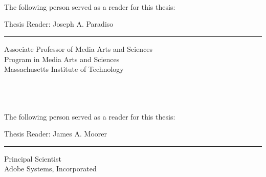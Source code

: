 
 \cleardoublepage
{}
\begin{fullwidth}
\mbox{ }\\
\mbox{ }\\
\mbox{ }\\ 
\vfill
\noindent The following person served as a reader for this thesis:\\
\vspace{10mm}

\noindent Thesis Reader: \hfill Joseph A. Paradiso\vspace{3pt}\hrule\vspace{6pt}
\flushright Associate Professor of Media Arts and Sciences\\
\flushright Program in Media Arts and Sciences\\
\flushright Massachusetts Institute of Technology\\

\thispagestyle{empty}  %
\end{fullwidth}
 
\cleardoublepage 
{}
\begin{fullwidth}
\mbox{ }\\
\mbox{ }\\
\mbox{ }\\ 
\vfill
\noindent The following person served as a reader for this thesis:\\
\vspace{10mm}

\noindent Thesis Reader: \hfill James A. Moorer\vspace{3pt}\hrule\vspace{6pt}
\flushright Principal Scientist\\
\flushright Adobe Systems, Incorporated\\
\thispagestyle{empty}  %
\end{fullwidth}
 


